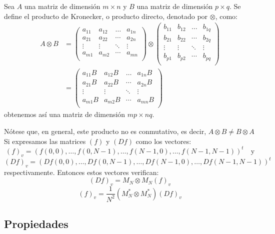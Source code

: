 \documentclass{article}
\begin{document}
\begin{definition}
    Sea $A$ una matriz de dimensión $m \times n$ y $B$ una matriz de dimensión $p \times q$. Se define el producto de Kronecker, o producto directo, denotado por $\otimes$, como:
    \begin{align*}
        A \otimes B & = \begin{pmatrix}
        a_{11} & a_{12} & \dots & a_{1n} \\
        a_{21} & a_{22} & \cdots & a_{2n} \\
        \vdots & \vdots & \ddots & \vdots \\
        a_{m1} & a_{m2} & \cdots & a_{mn} \\
        \end{pmatrix}
        \otimes
        \begin{pmatrix}
        b_{11} & b_{12} & \dots & b_{1q} \\
        b_{21} & b_{22} & \cdots & b_{2q} \\
        \vdots & \vdots & \ddots & \vdots \\
        b_{p1} & b_{p2} & \cdots & b_{pq} \\
        \end{pmatrix} \\
         & = \begin{pmatrix}
        a_{11} B & a_{12} B & \dots & a_{1n} B \\
        a_{21} B & a_{22} B & \cdots & a_{2n} B \\
        \vdots & \vdots & \ddots & \vdots \\
        a_{m1} B & a_{m2} B & \cdots & a_{mn} B \\
        \end{pmatrix}
    \end{align*}
    obtenemos así una matriz de dimensión $mp \times nq$.
\end{definition} 
Nótese que, en general, este producto no es conmutativo, es decir, $A \otimes B \neq B \otimes A$\\

Si expresamos las matrices $(f)$ y $(Df)$ como los vectores:
\[(f)_v=(f(0,0),\dots,f(0,N-1),\dots,f(N-1,0),\dots,f(N-1,N-1))^t \quad \text{y}\] \[(Df)_v=(Df(0,0),\dots,Df(0,N-1),\dots,Df(N-1,0),\dots,Df(N-1,N-1))^t\]
respectivamente. Entonces estos vectores verifican:
\[(Df)_v= M_N\otimes M_N(f)_v\]
\[(f)_v=\frac{1}{N^2}( M_N^{\ast}\otimes M_N^{\ast})(Df)_v\]

\subsection{Propiedades}
\end{document}
